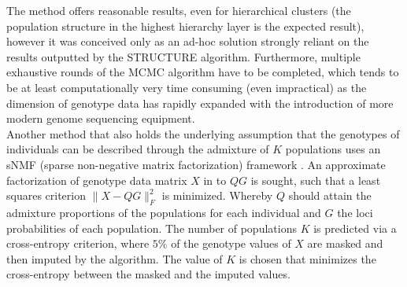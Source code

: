 \documentclass[a4paper, 11pt]{article}
\begin{document}
The method offers reasonable results, even for hierarchical clusters (the population structure in the highest hierarchy layer is the expected result), however it was conceived only as an ad-hoc solution strongly reliant on the results outputted by the STRUCTURE algorithm. Furthermore, multiple exhaustive rounds of the MCMC algorithm have to be completed, which tends to be at least computationally very time consuming (even impractical) as the dimension of genotype data has rapidly expanded with the introduction of more modern genome sequencing equipment. \\

Another method that also holds the underlying assumption that the genotypes of individuals can be described through the admixture of $K$ populations uses an sNMF (sparse non-negative matrix factorization) framework \parencite{frichot2014fast}. An approximate factorization of genotype data matrix $X$ in to $QG$ is sought, such that a least squares criterion $\parallel X - QG \parallel^2_F$ is minimized. Whereby $Q$ should attain the admixture proportions of the populations for each individual and $G$ the loci probabilities of each population. The number of populations $K$ is predicted via a cross-entropy criterion, where $5\% $ of the genotype values of $X$ are masked and then imputed by the algorithm. The value of $K$ is chosen that minimizes the cross-entropy between the masked and the imputed values.\\
\end{document}
